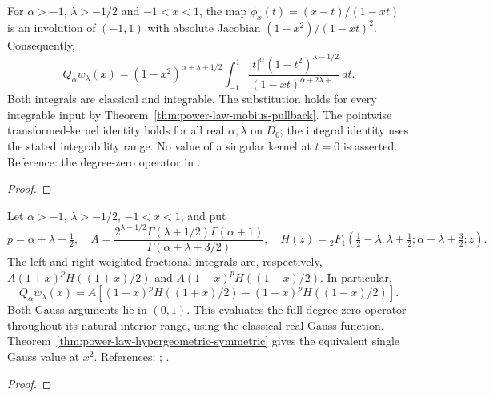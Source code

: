 \begin{supporting}
\begin{theorem}
\label{thm:power-law-mobius}
\leanok
For $\alpha>-1$, $\lambda>-1/2$ and $-1<x<1$, the map $\phi_x(t)=(x-t)/(1-xt)$ is an involution of
$(-1,1)$ with absolute Jacobian $(1-x^2)/(1-xt)^2$. Consequently,
\[
 Q_\alpha w_\lambda(x)=(1-x^2)^{\alpha+\lambda+1/2}
 \int_{-1}^1\frac{|t|^\alpha(1-t^2)^{\lambda-1/2}}
 {(1-xt)^{\alpha+2\lambda+1}}\,dt.
\]
Both integrals are classical and integrable. The substitution holds for every
integrable input by Theorem~\ref{thm:power-law-mobius-pullback}.
The pointwise transformed-kernel identity holds for all real $\alpha,\lambda$
on $D_0$; the integral identity uses the stated integrability range. No value
of a singular kernel at $t=0$ is asserted.
Reference: the degree-zero operator in \cite[Section 2]{gutleb-carrillo-olver}.
\end{theorem}
\begin{proof}
\leanok
\end{proof}

\begin{theorem}
\label{thm:power-law-hypergeometric-split}
\leanok
Let $\alpha>-1$, $\lambda>-1/2$, $-1<x<1$, and put
\[
 p=\alpha+\lambda+\tfrac12,\quad
 A=\frac{2^{\lambda-1/2}\Gamma(\lambda+1/2)\Gamma(\alpha+1)}
 {\Gamma(\alpha+\lambda+3/2)},\quad
 H(z)={}_2F_1(\tfrac12-\lambda,\lambda+\tfrac12;
                  \alpha+\lambda+\tfrac32;z).
\]
The left and right weighted fractional integrals are, respectively,
$A(1+x)^pH((1+x)/2)$ and $A(1-x)^pH((1-x)/2)$. In particular,
\[
 Q_\alpha w_\lambda(x)=A\left[(1+x)^pH((1+x)/2)
                                  +(1-x)^pH((1-x)/2)\right].
\]
Both Gauss arguments lie in $(0,1)$. This evaluates the full degree-zero
operator throughout its natural interior range, using the classical real
Gauss function. Theorem~\ref{thm:power-law-hypergeometric-symmetric}
gives the equivalent single Gauss value at $x^2$.
References: \cite[Section 2]{gutleb-carrillo-olver}; \cite[15.6.1]{dlmf}.
\end{theorem}
\begin{proof}
\leanok
\end{proof}




\end{supporting}
